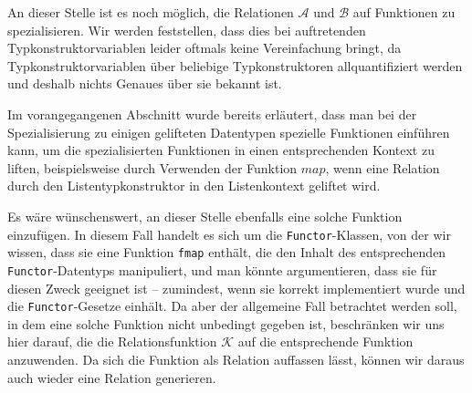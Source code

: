 
An dieser Stelle ist es noch möglich, die Relationen $\mathcal{A}$ und $\mathcal{B}$ auf Funktionen zu spezialisieren. Wir werden
feststellen, dass dies bei auftretenden Typkonstruktorvariablen leider oftmals keine Vereinfachung bringt, da Typkonstruktorvariablen
über beliebige Typkonstruktoren allquantifiziert werden und deshalb nichts Genaues über sie bekannt ist.

Im vorangegangenen Abschnitt wurde bereits erläutert, dass man bei der Spezialisierung zu einigen gelifteten Datentypen
spezielle Funktionen einführen kann, um die spezialisierten Funktionen in einen entsprechenden Kontext zu liften, beispielsweise
durch Verwenden der Funktion $map$, wenn eine Relation durch den Listentypkonstruktor in den Listenkontext geliftet wird.

Es wäre wünschenswert, an dieser Stelle ebenfalls eine solche Funktion einzufügen. In diesem Fall handelt es sich um die
\texttt{Functor}-Klassen, von der wir wissen, dass sie eine Funktion \texttt{fmap} enthält, die den Inhalt des entsprechenden
\texttt{Functor}-Datentyps manipuliert, und man könnte argumentieren, dass sie für diesen Zweck geeignet ist -- zumindest, wenn sie
korrekt implementiert wurde und die \texttt{Functor}-Gesetze einhält. Da aber der allgemeine Fall betrachtet werden soll, in dem
eine solche Funktion nicht unbedingt gegeben ist, beschränken wir uns hier darauf, die
die Relationsfunktion $\mathcal{K}$ auf
die entsprechende Funktion anzuwenden. Da sich die Funktion als Relation auffassen lässt, können wir daraus auch wieder
eine Relation generieren.


